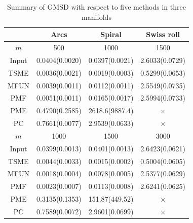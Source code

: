 \begin{table}
    \centering
    \caption{Summary of GMSD with respect to five methods in three manifolds}
    \label{tab:gmsd}
    \begin{tabular}{@{}cccc@{}}
    \toprule
          & Arcs                    & Spiral                  & Swiss roll              \\ \midrule
    $m$ & 500 & 1000 & 1500 \\
    Input & 0.0404(0.0020)          & 0.0397(0.0021)          & 2.6033(0.0729)          \\
    TSME  & 0.0036(0.0021)          & 0.0019(0.0003) & 0.5299(0.0653) \\
    MFUN  & 0.0039(0.0011) & 0.0112(0.0011)          & 2.5549(0.0735)          \\
    PMF   & 0.0051(0.0011)          & 0.0165(0.0017)          & 2.5994(0.0733)          \\
    PME   & 0.4790(0.2585)          & 2618.6(9887.4)          &            $\times$             \\
    PC    & 0.7661(0.0077)          & 2.9539(0.0633)          &            $\times$             \\ \midrule
        $m$ & 1000 & 1500 & 3000 \\
    Input & 0.0399(0.0013)          & 0.0401(0.0013)          & 2.6423(0.0621)          \\
    TSME  & 0.0044(0.0033)          & 0.0015(0.0002) & 0.5004(0.0605) \\
    MFUN  & 0.0018(0.0004) & 0.0078(0.0005)          & 2.5377(0.0629)          \\
    PMF   & 0.0023(0.0007)          & 0.0113(0.0008)          & 2.6241(0.0625)          \\
    PME   & 0.3135(0.1353)          & 151.87(449.52)          &            $\times$             \\
    PC    & 0.7589(0.0072)          & 2.9601(0.0699)          &            $\times$             \\ 
    \bottomrule
\end{tabular}
\end{table}


